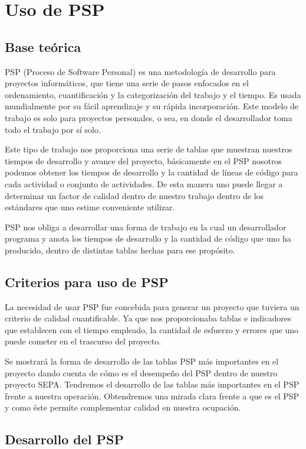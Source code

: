 \documentclass[a4paper,12pt,openany,oneside]{book}
\begin{document}
\chapter{Uso de PSP}
\thispagestyle{empty}
\section{Base teórica}
PSP (Proceso de Software Personal) es una metodología de desarrollo para proyectos informáticos, que tiene una serie de pasos enfocados en el ordenamiento, cuantificación y la categorización del trabajo y el tiempo. Es usada mundialmente por su fácil aprendizaje y su rápida incorporación. Este modelo de trabajo es solo para proyectos personales, o sea, en donde el desarrollador toma todo el trabajo por sí solo.

Este tipo de trabajo nos proporciona una serie de tablas que muestran nuestros tiempos de desarrollo y avance del proyecto, básicamente en el PSP nosotros podemos obtener los tiempos de desarrollo y la cantidad de líneas de código para cada actividad o conjunto de actividades. De esta manera uno puede llegar a determinar un factor de calidad dentro de nuestro trabajo dentro de los estándares que uno estime conveniente utilizar.

PSP nos obliga a desarrollar una forma de trabajo en la cual un desarrollador programa y anota los tiempos de desarrollo y la cantidad de código que uno ha producido, dentro de distintas tablas hechas para ese propósito.

\section{Criterios para uso de PSP}
La necesidad de usar PSP fue concebida para generar un proyecto que tuviera un criterio de calidad cuantificable. Ya que nos proporcionaba tablas e indicadores que establecen con el tiempo empleado, la cantidad de esfuerzo y errores que uno puede cometer en el trascurso del proyecto.

Se mostrará la forma de desarrollo de las tablas PSP más importantes en el proyecto dando cuenta de cómo es el desempeño del PSP dentro de nuestro proyecto SEPA. Tendremos el desarrollo de las tablas más importantes en el PSP frente a nuestra operación. Obtendremos una mirada clara frente a que es el PSP y como éste permite complementar calidad en nuestra ocupación.

\section{Desarrollo del PSP}
\end{document}

